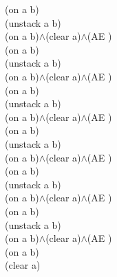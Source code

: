 {{(on a b)\\
(unstack a b)\\
(on a b)$\wedge$(clear a)$\wedge$(AE )\\
(on a b)\\
(unstack a b)\\
(on a b)$\wedge$(clear a)$\wedge$(AE )\\
(on a b)\\
(unstack a b)\\
(on a b)$\wedge$(clear a)$\wedge$(AE )\\
(on a b)\\
(unstack a b)\\
(on a b)$\wedge$(clear a)$\wedge$(AE )\\
(on a b)\\
(unstack a b)\\
(on a b)$\wedge$(clear a)$\wedge$(AE )\\
(on a b)\\
(unstack a b)\\
(on a b)$\wedge$(clear a)$\wedge$(AE )\\
(on a b)\\
(clear a)\\
}%
}

